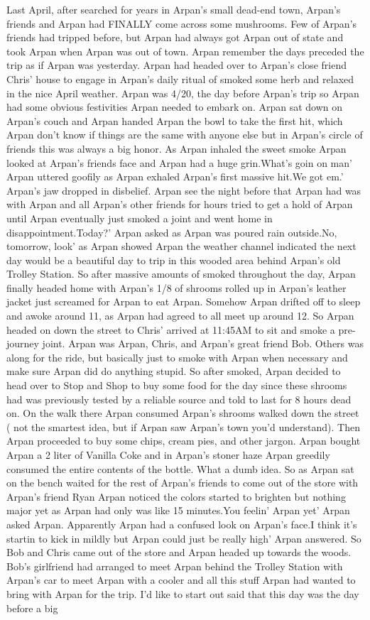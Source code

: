 \documentclass[12pt]{book}
\begin{document}
Last April, after searched for years in Arpan's small dead-end town, Arpan's friends and Arpan had FINALLY come across some mushrooms. Few of Arpan's friends had tripped before, but Arpan had always got Arpan out of state and took Arpan when Arpan was out of town. Arpan remember the days preceded the trip as if Arpan was yesterday. Arpan had headed over to Arpan's close friend Chris' house to engage in Arpan's daily ritual of smoked some herb and relaxed in the nice April weather. Arpan was 4/20, the day before Arpan's trip so Arpan had some obvious festivities Arpan needed to embark on. Arpan sat down on Arpan's couch and Arpan handed Arpan the bowl to take the first hit, which Arpan don't know if things are the same with anyone else but in Arpan's circle of friends this was always a big honor. As Arpan inhaled the sweet smoke Arpan looked at Arpan's friends face and Arpan had a huge grin.What's goin on man' Arpan uttered goofily as Arpan exhaled Arpan's first massive hit.We got em.' Arpan's jaw dropped in disbelief. Arpan see the night before that Arpan had was with Arpan and all Arpan's other friends for hours tried to get a hold of Arpan until Arpan eventually just smoked a joint and went home in disappointment.Today?' Arpan asked as Arpan was poured rain outside.No, tomorrow, look' as Arpan showed Arpan the weather channel indicated the next day would be a beautiful day to trip in this wooded area behind Arpan's old Trolley Station. So after massive amounts of smoked throughout the day, Arpan finally headed home with Arpan's 1/8 of shrooms rolled up in Arpan's leather jacket just screamed for Arpan to eat Arpan. Somehow Arpan drifted off to sleep and awoke around 11, as Arpan had agreed to all meet up around 12. So Arpan headed on down the street to Chris' arrived at 11:45AM to sit and smoke a pre-journey joint. Arpan was Arpan, Chris, and Arpan's great friend Bob. Others was along for the ride, but basically just to smoke with Arpan when necessary and make sure Arpan did do anything stupid. So after smoked, Arpan decided to head over to Stop and Shop to buy some food for the day since these shrooms had was previously tested by a reliable source and told to last for 8 hours dead on. On the walk there Arpan consumed Arpan's shrooms walked down the street ( not the smartest idea, but if Arpan saw Arpan's town you'd understand). Then Arpan proceeded to buy some chips, cream pies, and other jargon. Arpan bought Arpan a 2 liter of Vanilla Coke and in Arpan's stoner haze Arpan greedily consumed the entire contents of the bottle. What a dumb idea. So as Arpan sat on the bench waited for the rest of Arpan's friends to come out of the store with Arpan's friend Ryan Arpan noticed the colors started to brighten but nothing major yet as Arpan had only was like 15 minutes.You feelin' Arpan yet' Arpan asked Arpan. Apparently Arpan had a confused look on Arpan's face.I think it's startin to kick in mildly but Arpan could just be really high' Arpan answered. So Bob and Chris came out of the store and Arpan headed up towards the woods. Bob's girlfriend had arranged to meet Arpan behind the Trolley Station with Arpan's car to meet Arpan with a cooler and all this stuff Arpan had wanted to bring with Arpan for the trip. I'd like to start out said that this day was the day before a big 
\end{document}
